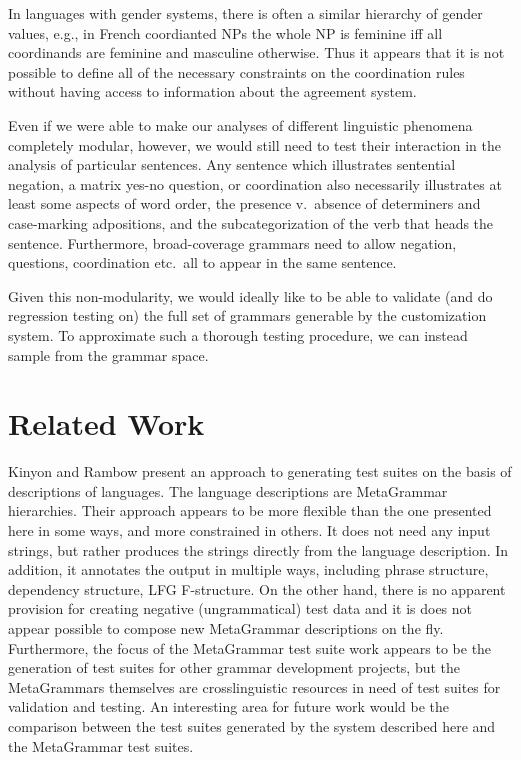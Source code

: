 \documentclass[11pt]{article}
\begin{document}
%
In languages with gender systems, there is often a similar hierarchy
of gender values, e.g., in French coordianted NPs the whole NP is feminine
iff all coordinands are feminine and masculine otherwise.  Thus
it appears that it is not possible to define all of the necessary
constraints on the coordination rules without having access to information
about the agreement system.  

Even if we were able to make our analyses of different linguistic
phenomena completely modular, however, we would still need to test
their interaction in the analysis of particular sentences.
Any sentence which illustrates sentential negation, a matrix yes-no
question, or coordination also necessarily illustrates at least some
aspects of word order, the presence v.\ absence of determiners and
case-marking adpositions, and the subcategorization of the verb that
heads the sentence.  Furthermore, broad-coverage grammars need to
allow negation, questions, coordination etc.\ all to appear in the
same sentence.

Given this non-modularity, we would ideally like to be able to
validate (and do regression testing on) the full set of grammars
generable by the customization system.  To approximate such a thorough
testing procedure, we can instead sample from the grammar space.

\section{Related Work}
\label{rw}
Kinyon and Rambow  present an approach to
generating test suites on the basis of descriptions of languages.  The
language descriptions are MetaGrammar hierarchies. Their approach
appears to be more flexible than the one presented here in some ways,
and more constrained in others.  It does not need any input strings,
but rather produces the strings directly from the language
description. In addition, it annotates the output in multiple ways,
including phrase structure, dependency structure, LFG F-structure.  On
the other hand, there is no apparent provision for creating negative
(ungrammatical) test data and it is does not appear possible to
compose new MetaGrammar descriptions on the fly.  Furthermore, the
focus of the MetaGrammar test suite work appears to be the generation
of test suites for other grammar development projects, but the
MetaGrammars themselves are crosslinguistic resources in need of test
suites for validation and testing. An interesting area for future work
would be the comparison between the test suites generated by the
system described here and the MetaGrammar test suites.
\end{document}

